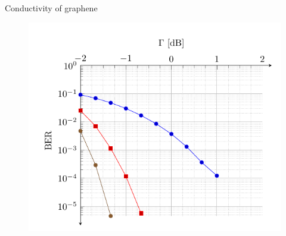 \documentclass[handout,xcolor={usenames,dvipsnames},11pt]{beamer}
\begin{document}
\begin{frame}[c]{Conductivity of graphene}
    \vspace{-15pt}
    \begin{figure}
        \centering
        \includegraphics[height=\textheight]{./images/BER}
    \end{figure}\pause
\end{frame}
\end{document}
